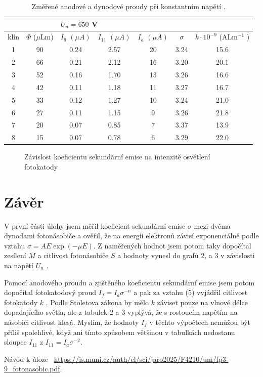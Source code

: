 \documentclass[a4paper,11pt]{article}
\begin{document}
\vspace{-25pt}

\begin{table}[htpb]
    \small
    \centering
    \begin{tabular}{| c c | c c c c c |}
        \hline
        \multicolumn{2}{|l|}{} & \multicolumn{5}{l|}{$ U_n = 650 $ V} \\\hline
        klín & $ \Phi $ ($ \mu $Lm) & $ I_{9} $ $ (\mu A) $  & $ I_{11} $ $ (\mu A) $ & $ I_a $ $ (\mu A) $ & $ \sigma $ & $ k \cdot 10^{-9} $ (ALm$^{-1}  $ ) \\ \hline
        1 & 90 & 0.24 & 2.57 & 20 & 3.24 & 15.6 \\
        2 & 66 & 0.21 & 2.12 & 16 & 3.20 & 20.1 \\
        3 & 52 & 0.16 & 1.70 & 13 & 3.26 & 16.6 \\
        4 & 42 & 0.11 & 1.18 & 11 & 3.27 & 16.7 \\
        5 & 33 & 0.12 & 1.27 & 10 & 3.24 & 21.0 \\
        6 & 27 & 0.11 & 1.15 & 9  & 3.26 & 21.8 \\
        7 & 20 & 0.07 & 0.85 & 7  & 3.37 & 13.9 \\
        8 & 15 & 0.07 & 0.78 & 6  & 3.29 & 22.0 \\
        \hline
    \end{tabular}
    \caption{Změřené anodové a dynodové proudy při konstantním napětí .}
\end{table}

\begin{figure}[htpb]
    \centering
    
    \captionsetup{type=graph}
    \caption{Závislost koeficientu sekundární emise na intenzitě osvětlení fotokatody}
\end{figure} 

\section{Závěr}

V první části úlohy jsem měřil koeficient sekundární emise $ \sigma $ mezi dvěma dynodami fotonásobiče a ověřil, že na energii elektronů závisí exponenciálně podle vztahu $ \sigma = A E \exp (-\mu E) $. 
Z naměřených hodnot jsem potom taky dopočítal zesílení $ M $ a citlivost fotonásobiče $ S $ a hodnoty vynesl do grafů 2, a 3 v závislosti na napětí $ U_n $ .

Pomocí anodového proudu a zjištěného koeficientu sekundární emise jsem potom dopočítal fotokatodový proud $ I_f = I_a \sigma^{-n} $ a pak za vztahu (5) vyjádřil citlivost fotokatody $ k $ . Podle Stoletova zákona by mělo $ k $ záviset pouze na vlnové délce dopadajícího světla, ale z tabulek 2 a 3 vyplývá, že s rostoucím napětím na násobiči citlivost klesá. Myslím, že hodnoty $ I_f $ v těchto výpočtech nemůžou být příliš spolehlivé, když ani tímto způsobem většinou v tabulkách nedostanu sloupce $ I_{11} $ z $ I_{11} = I_a \sigma^{-2} $.


\begin{thebibliography}{0}
 Návod k úloze ~\url{https://is.muni.cz/auth/el/sci/jaro2025/F4210/um/fp3-9_fotonasobic.pdf}.   
\end{thebibliography}
\end{document}
